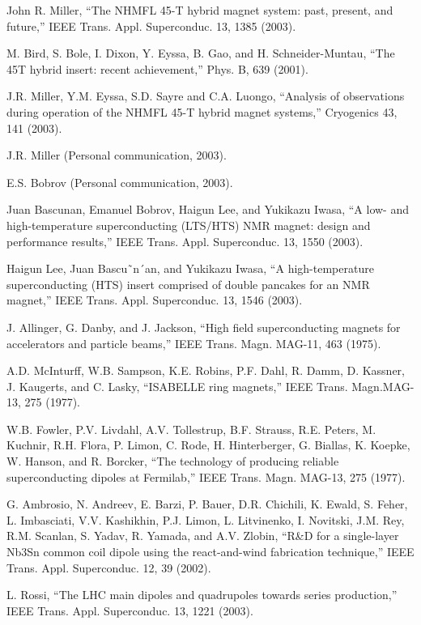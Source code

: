 \noindent [3.28] John R. Miller, ``The NHMFL 45-T hybrid magnet system: past, present, and
future,” IEEE Trans. Appl. Superconduc. 13, 1385 (2003).

\noindent [3.29] M. Bird, S. Bole, I. Dixon, Y. Eyssa, B. Gao, and H. Schneider-Muntau, ``The 45T hybrid insert: recent achievement,” Phys. B, 639 (2001).

\noindent [3.30] J.R. Miller, Y.M. Eyssa, S.D. Sayre and C.A. Luongo, ``Analysis of observations
during operation of the NHMFL 45-T hybrid magnet systems,” Cryogenics 43, 141
(2003).

\noindent [3.31] J.R. Miller (Personal communication, 2003).

\noindent [3.32] E.S. Bobrov (Personal communication, 2003).

\noindent [3.33] Juan Bascunan, Emanuel Bobrov, Haigun Lee, and Yukikazu Iwasa, ``A low- and high-temperature superconducting (LTS/HTS) NMR magnet: design and performance results,” IEEE Trans. Appl. Superconduc. 13, 1550 (2003).

\noindent [3.34] Haigun Lee, Juan Bascu˜n´an, and Yukikazu Iwasa, ``A high-temperature superconducting (HTS) insert comprised of double pancakes for an NMR magnet,” IEEE Trans. Appl. Superconduc. 13, 1546 (2003).

\noindent [3.35] J. Allinger, G. Danby, and J. Jackson, ``High field superconducting magnets for
accelerators and particle beams,” IEEE Trans. Magn. MAG-11, 463 (1975).

\noindent [3.36] A.D. McInturff, W.B. Sampson, K.E. Robins, P.F. Dahl, R. Damm, D. Kassner,
J. Kaugerts, and C. Lasky, ``ISABELLE ring magnets,” IEEE Trans. Magn.MAG-
13, 275 (1977).

\noindent [3.37] W.B. Fowler, P.V. Livdahl, A.V. Tollestrup, B.F. Strauss, R.E. Peters, M. Kuchnir,
R.H. Flora, P. Limon, C. Rode, H. Hinterberger, G. Biallas, K. Koepke, W. Hanson,
and R. Borcker, ``The technology of producing reliable superconducting dipoles at Fermilab,” IEEE Trans. Magn. MAG-13, 275 (1977).

\noindent [3.38] G. Ambrosio, N. Andreev, E. Barzi, P. Bauer, D.R. Chichili, K. Ewald, S. Feher,
L. Imbasciati, V.V. Kashikhin, P.J. Limon, L. Litvinenko, I. Novitski, J.M. Rey,
R.M. Scanlan, S. Yadav, R. Yamada, and A.V. Zlobin, ``R\&D for a single-layer
Nb3Sn common coil dipole using the react-and-wind fabrication technique,” IEEE
Trans. Appl. Superconduc. 12, 39 (2002).

\noindent [3.39] L. Rossi, ``The LHC main dipoles and quadrupoles towards series production,”
IEEE Trans. Appl. Superconduc. 13, 1221 (2003).

